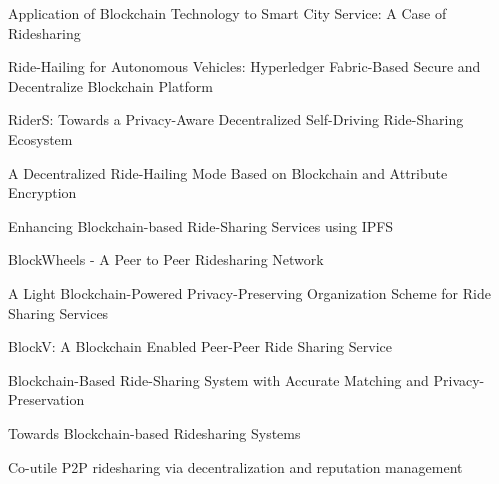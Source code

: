 Application of Blockchain Technology to Smart City Service: A Case of Ridesharing

Ride-Hailing for Autonomous Vehicles: Hyperledger Fabric-Based Secure and Decentralize Blockchain Platform

RiderS: Towards a Privacy-Aware Decentralized Self-Driving Ride-Sharing Ecosystem

A Decentralized Ride-Hailing Mode Based on Blockchain and Attribute Encryption

Enhancing Blockchain-based Ride-Sharing Services using IPFS

BlockWheels - A Peer to Peer Ridesharing Network

A Light Blockchain-Powered Privacy-Preserving Organization Scheme for Ride Sharing Services

BlockV: A Blockchain Enabled Peer-Peer Ride Sharing Service

Blockchain-Based Ride-Sharing System with Accurate Matching and Privacy-Preservation

Towards Blockchain-based Ridesharing Systems

Co-utile P2P ridesharing via decentralization and reputation management